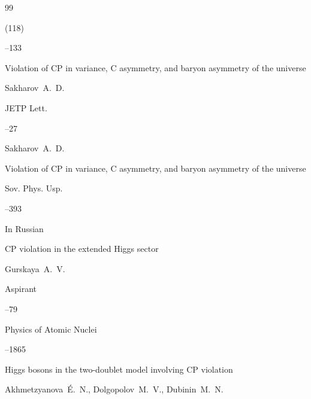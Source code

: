 \begin{thebibliography}{99}

(118)

--133






\paper Violation of CP in variance, C asymmetry, and baryon asymmetry of the universe

\by Sakharov~A.~D.

\jour JETP Lett. 


--27 


\morerref

\by Sakharov~A.~D.

\paper Violation of CP in variance, C asymmetry, and baryon asymmetry of the universe

\jour Sov. Phys. Usp. 



–393 








\lang In Russian

\paper  CP violation in the extended Higgs sector

\by Gurskaya~A.~V.

\jour Aspirant



--79






\jour Physics of Atomic Nuclei




--1865

\paper Higgs bosons in the two-doublet model involving CP violation


\by Akhmetzyanova~\'E.~N., Dolgopolov~M.~V., Dubinin~M.~N. 






\end{thebibliography}
